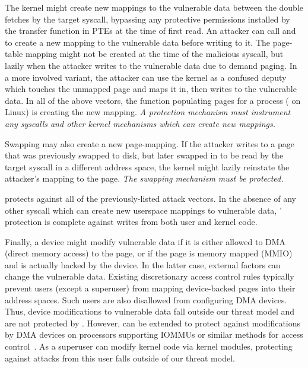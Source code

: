 The kernel might create new mappings to the vulnerable data
between the double fetches by the target syscall, bypassing any 
protective permissions installed by the transfer function in 
PTEs at the time of first read.
An attacker can call  and  to create
a new mapping to the vulnerable data before writing to it.
The page-table mapping might not be created at the time of the malicious
syscall, but lazily when the attacker writes to the vulnerable data
due to demand paging.
In a more involved variant, the attacker can use the kernel as a
confused deputy which touches the unmapped page and maps it in,
then writes to the vulnerable data.
In all of the above vectors, the function populating pages for a
process ( on Linux) is creating the new mapping.
\emph{A protection mechanism must instrument any syscalls
and other kernel mechanisms which can create new mappings.}

Swapping may also create a new page-mapping.
If the attacker writes to a page that was previously swapped
to disk, but later swapped in to be read by the target syscall in
a different address space, the kernel might lazily reinstate
the attacker's mapping to the page.
\emph{The swapping mechanism must be protected.}

\midas protects against all of the previously-listed attack vectors.
In the absence of any other syscall which can create new userspace
mappings to vulnerable data, \midas' protection is complete
against writes from both user and kernel code.

Finally, a device might modify vulnerable data if it is either
allowed to DMA (direct memory access) to the page, or if the page is memory 
mapped (MMIO) and is actually backed by the device.
In the latter case, external factors can change the vulnerable data.
Existing discretionary access control rules typically prevent users
(except a superuser) from mapping device-backed pages into their
address spaces.
Such users are also disallowed from configuring DMA devices.
Thus, device modifications to vulnerable data fall outside
our threat model and are not protected by \midas.
However, \midas can be extended to protect against modifications by DMA devices
on processors supporting IOMMUs or similar methods for
access control~\cite{olsonbordercontrol}.
As a superuser can modify kernel code via kernel modules, protecting against 
attacks from this user falls outside of our threat model.


